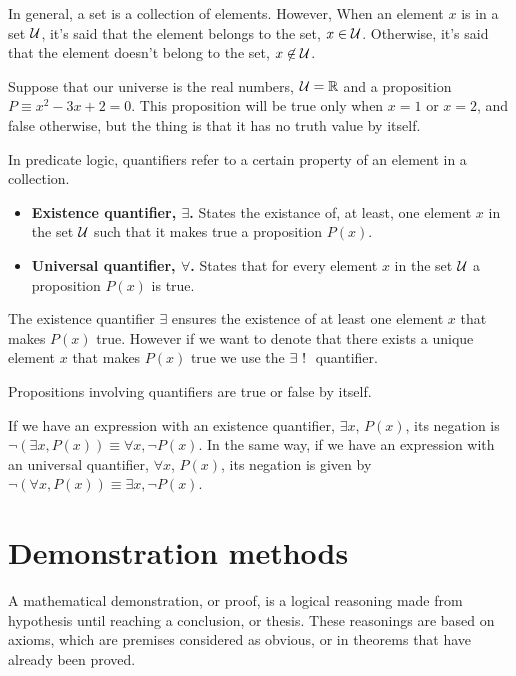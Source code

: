 In general, a set is a collection of elements. However, When an element $x$ is in a set $\mathcal{U}$, it's said that the element 
belongs to the set, $x\in\mathcal{U}$. Otherwise, it's said that the element doesn't belong to the set, $x\not\in\mathcal{U}$.

\begin{example}
    Suppose that our universe is the real numbers, $\uset = \R$ and a proposition $P\equiv x^2 - 3x + 2 = 0$.
    This proposition will be true only when $x = 1$ or $x = 2$, and false otherwise, but the thing is that it
    has no truth value by itself.
\end{example}

\begin{defn}[Quantifiers]
    In predicate logic, quantifiers refer to a certain property of an element in a collection.
    \begin{itemize}[itemsep = -2pt, topsep = -1pt]
        \item\textbf{Existence quantifier, $\exists$.} States the existance of, at least, one element $x$ in 
            the set $\mathcal{U}$ such that it makes true a proposition $P(x)$.
        \item\textbf{Universal quantifier, $\forall$.} States that for every element $x$ in the set $\mathcal{U}$ a
            proposition $P(x)$ is true.
    \end{itemize}
\end{defn}

\begin{remark}
    The existence quantifier $\exists$ ensures the existence of at least one element $x$ that makes $P(x)$ true. 
    However if we want to denote that there exists a unique element $x$ that makes $P(x)$ true we use the
    $\uexists$ quantifier.
\end{remark}

\begin{note}
    Propositions involving quantifiers are true or false by itself.
\end{note}

If we have an expression with an existence quantifier, $\exists x$, $P(x)$, its negation is $\neg\left(
\exists x, P(x)\right)\equiv\forall x, \neg P(x)$. In the same way, if we have an expression with an universal
quantifier, $\forall x$, $P(x)$, its negation is given by $\neg\left(\forall x, P(x)\right)\equiv\exists x,
\neg P(x)$.

\section{Demonstration methods}
A mathematical demonstration, or proof, is a logical reasoning made from hypothesis until reaching a conclusion,
or thesis. These reasonings are based on axioms, which are premises considered as obvious, or in theorems
that have already been proved.

